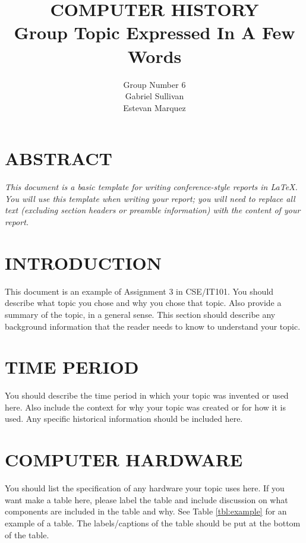 \documentclass[letterpaper, 10 pt, conference]{IEEEconf}
\title{\LARGE \bf
COMPUTER HISTORY\\
\large Group Topic Expressed In A Few Words
}
\author{Group Number 6\\
\small Gabriel Sullivan\\
\small Estevan Marquez\\
}
\begin{document}
\maketitle
\thispagestyle{empty}
\pagestyle{empty}


\section*{ABSTRACT}
\textit{
This document is a basic template for writing conference-style
reports in LaTeX. You will use this template when writing
your report; you will need to replace all text (excluding
section headers or preamble information) with the content
of your report.
}

\section{INTRODUCTION}

This document is an example of Assignment 3 in CSE/IT101.
You should describe what topic you chose and
why you chose that topic. Also provide a summary of the
topic, in a general sense. This section should describe any
background information that the reader needs to know to
understand your topic.

\section{TIME PERIOD}

You should describe the time period in which your topic was
invented or used here. Also include the context for why your
topic was created or for how it is used. Any specific historical
information should be included here.

\section{COMPUTER HARDWARE}

You should list the specification of any hardware your topic
uses here. If you want make a table here, please label the table
and include discussion on what components are included in the
table and why. See Table
\ref{tbl:example} for an example of a table.
The labels/captions of the table should be put at the bottom
of the table.
\end{document}
